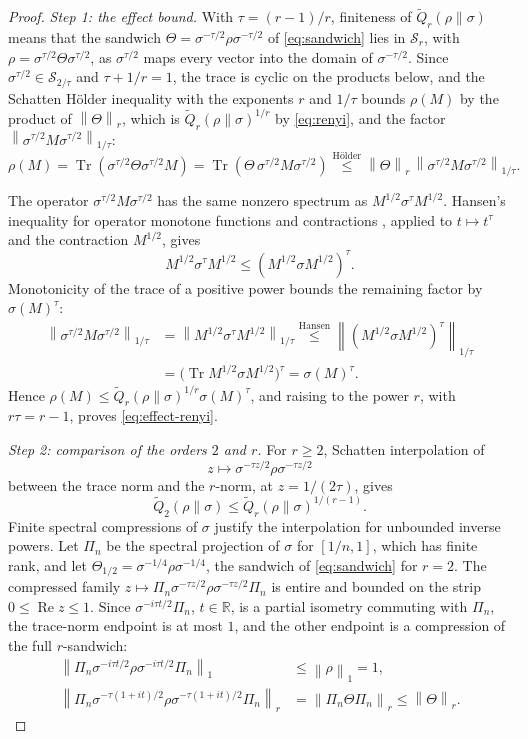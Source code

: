 \documentclass[11pt]{amsart}
\numberwithin{equation}{section}
\theoremstyle{definition}
\newcommand{\R}{\mathbb R}
\newcommand{\Sc}{\mathcal S}
\newcommand{\Qtil}{\widetilde Q}
\newcommand{\Tr}{\operatorname{Tr}}
\newcommand{\Rea}{\operatorname{Re}}
\newcommand{\norm}[1]{\left\|#1\right\|}
\begin{document}
\begin{proof}
\emph{Step 1: the effect bound.} With \(\tau=(r-1)/r\), finiteness of
\(\Qtil_r(\rho\|\sigma)\) means that the sandwich
\(\Theta=\sigma^{-\tau/2}\rho\sigma^{-\tau/2}\) of \eqref{eq:sandwich}
lies in \(\Sc_r\), with
\(\rho=\sigma^{\tau/2}\Theta\sigma^{\tau/2}\), as \(\sigma^{\tau/2}\) maps every
vector into the domain of \(\sigma^{-\tau/2}\). Since
\(\sigma^{\tau/2}\in\Sc_{2/\tau}\) and \(\tau+1/r=1\), the trace is
cyclic on the products below, and the Schatten Hölder inequality with
the exponents \(r\) and \(1/\tau\) bounds \(\rho(M)\) by the product of
\(\norm{\Theta}_r\), which is \(\Qtil_r(\rho\|\sigma)^{1/r}\) by
\eqref{eq:renyi}, and the factor
\(\norm{\sigma^{\tau/2}M\sigma^{\tau/2}}_{1/\tau}\):
\[
 \rho(M)
 =\Tr(\sigma^{\tau/2}\Theta\sigma^{\tau/2}M)
 =\Tr(\Theta\,\sigma^{\tau/2}M\sigma^{\tau/2})
 \overset{\text{Hölder}}{\le}\norm{\Theta}_r\,
   \norm{\sigma^{\tau/2}M\sigma^{\tau/2}}_{1/\tau}.
\]

The operator \(\sigma^{\tau/2}M\sigma^{\tau/2}\) has the same nonzero
spectrum as \(M^{1/2}\sigma^\tau M^{1/2}\). Hansen's inequality for operator monotone
functions and contractions \cite[Theorem]{Hansen80}, applied to
\(t\mapsto t^\tau\) and the contraction \(M^{1/2}\), gives
\[
 M^{1/2}\sigma^\tau M^{1/2}
 \le(M^{1/2}\sigma M^{1/2})^\tau.
\]
Monotonicity of the trace of a positive power bounds the remaining
factor by \(\sigma(M)^\tau\):
\begin{align*}
 \norm{\sigma^{\tau/2}M\sigma^{\tau/2}}_{1/\tau}
 &=\norm{M^{1/2}\sigma^\tau M^{1/2}}_{1/\tau}
 \overset{\text{Hansen}}{\le}\norm{(M^{1/2}\sigma M^{1/2})^\tau}_{1/\tau}\\
 &=\bigl(\Tr M^{1/2}\sigma M^{1/2}\bigr)^\tau
 =\sigma(M)^\tau.
\end{align*}
Hence \(\rho(M)\le\Qtil_r(\rho\|\sigma)^{1/r}\sigma(M)^\tau\), and
raising to the power \(r\), with \(r\tau=r-1\), proves
\eqref{eq:effect-renyi}.

\smallskip
\emph{Step 2: comparison of the orders \(2\) and \(r\).}
For \(r\ge2\), Schatten interpolation \cite{Simon05} of
\[
 z\longmapsto\sigma^{-\tau z/2}\rho\sigma^{-\tau z/2}
\]
between the trace norm and the \(r\)-norm, at \(z=1/(2\tau)\), gives
\[
 \Qtil_2(\rho\|\sigma)
 \le\Qtil_r(\rho\|\sigma)^{1/(r-1)}.
\]
Finite spectral compressions of \(\sigma\) justify the interpolation for
unbounded inverse powers. Let \(\Pi_n\) be the spectral projection of
\(\sigma\) for \([1/n,1]\), which has finite rank, and let
\(\Theta_{1/2}=\sigma^{-1/4}\rho\sigma^{-1/4}\), the sandwich of
\eqref{eq:sandwich} for \(r=2\). The compressed family
\(z\mapsto\Pi_n\sigma^{-\tau z/2}\rho\sigma^{-\tau z/2}\Pi_n\) is entire
and bounded on the strip \(0\le\Rea z\le1\). Since
\(\sigma^{-i\tau t/2}\Pi_n\), \(t\in\R\), is a partial isometry
commuting with \(\Pi_n\), the trace-norm endpoint is at most \(1\), and
the other endpoint is a compression of the full \(r\)-sandwich:
\begin{align*}
 \norm{\Pi_n\sigma^{-i\tau t/2}\rho\sigma^{-i\tau t/2}\Pi_n}_1
 &\le\norm{\rho}_1=1,\\
 \norm{\Pi_n\sigma^{-\tau(1+it)/2}\rho\sigma^{-\tau(1+it)/2}\Pi_n}_r
 &=\norm{\Pi_n\Theta\Pi_n}_r\le\norm{\Theta}_r.
\end{align*}


\end{proof}
\end{document}
